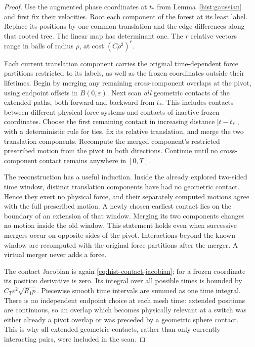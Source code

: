 \begin{proof}
Use the augmented phase coordinates at $t_*$ from
Lemma~\ref{hist:gaussian} and first fix their velocities.  Root each
component of the forest at its least label.  Replace its positions
by one common translation and the edge differences along that rooted
tree.  The linear map has determinant one.  The $r$ relative vectors
range in balls of radius $\rho$, at cost $(C\rho^3)^r$.

Each current translation component carries the original time-dependent
force partitions restricted to its labels, as well as the frozen
coordinates outside their lifetimes.  Begin by merging any remaining
cross-component overlaps at the pivot, using endpoint offsets in
$B(0,\varepsilon)$.  Next scan \emph{all} geometric contacts of the
extended paths, both forward and backward from $t_*$.  This includes
contacts between different physical force systems and contacts of
inactive frozen coordinates.  Choose the first remaining contact in
increasing distance $|t-t_*|$, with a deterministic rule for ties,
fix its relative translation, and merge the two translation components.
Recompute the merged component's restricted prescribed motion from
the pivot in both directions.  Continue until no cross-component
contact remains anywhere in $[0,T]$.

The reconstruction has a useful induction.  Inside the already
explored two-sided time window, distinct translation components have
had no geometric contact.  Hence they exert no physical force, and
their separately computed motions agree with the full prescribed
motion.  A newly chosen earliest contact lies on the boundary of an
extension of that window.  Merging its two components changes no
motion inside the old window.  This statement holds even when
successive mergers occur on opposite sides of the pivot.  Interactions
beyond the known window are recomputed with the original force
partitions after the merger.  A virtual merger never adds a force.

The contact Jacobian is again
\eqref{eq:hist-contact-jacobian}; for a frozen coordinate its position
derivative is zero.  Its integral over all possible times is bounded
by $C_T\varepsilon^2\sqrt{R_1p}$.  Piecewise smooth time intervals
are summed as one time integral.  There is no independent endpoint
choice at each mesh time: extended positions are continuous, so an
overlap which becomes physically relevant at a switch was either
already a pivot overlap or was preceded by a geometric sphere
contact.  This is why all extended geometric contacts, rather than
only currently interacting pairs, were included in the scan.


\end{proof}
